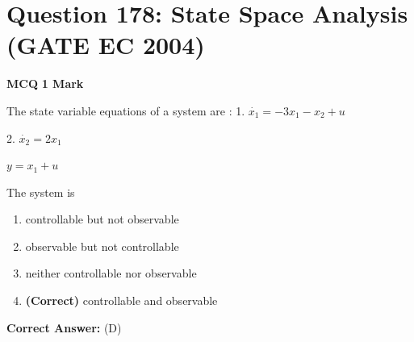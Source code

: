 \documentclass[11pt,a4paper]{article}
\begin{document}
\section*{Question 178: State Space Analysis (GATE EC 2004)}
\noindent \textbf{\color{primary}MCQ} \hfill \textbf{\color{secondary}1 Mark}


\noindent The state variable equations of a system are : 
 1.  $\dot{x_{1}}=-3x_{1}-x_{2}+u$

  2. $\dot{x_{2}}=2x_{1}$

  $y=x_{1}+u$

 The system is


\begin{enumerate}[label=(\Alph*)]
    \item controllable but not observable
    \item observable but not controllable
    \item neither controllable nor observable
    \item \textbf{(Correct)} controllable and observable
\end{enumerate}

\noindent \textbf{Correct Answer:} (D)
\end{document}
